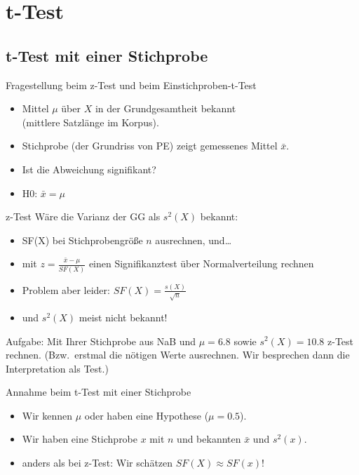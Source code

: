 \section[t-Test]{t-Test}

\subsection{t-Test mit einer Stichprobe}

\begin{frame}
  {Fragestellung beim z-Test und beim Einstichproben-t-Test}
  \begin{itemize}[<+->]
    \item Mittel $\mu$ über $X$ in der Grundgesamtheit bekannt\\
      (\zB mittlere Satzlänge im Korpus).
    \item Stichprobe (\zB der Grundriss von PE) zeigt gemessenes Mittel $\bar{x}$.
    \item Ist die Abweichung signifikant?
    \item \alert{H0: $\bar{x}=\mu$}
  \end{itemize}
\end{frame}

\begin{frame}
  {z-Test}
    Wäre die \alert{Varianz der GG} als $s^2(X)$ bekannt:\\
    \vspace{0.5cm}
    \begin{itemize}[<+->]
      \item SF(X) bei Stichprobengröße $n$ ausrechnen, und\ldots
      \item mit \alert{$z=\frac{\bar{x}-\mu}{SF(X)}$} einen Signifikanztest über Normalverteilung rechnen
        \vspace{\baselineskip}
      \item Problem aber leider: $SF(X)=\frac{s(X)}{\sqrt{n}}$
      \item und $s^2(X)$ meist nicht bekannt!
    \end{itemize}
    \vspace{\baselineskip}
    Aufgabe: Mit Ihrer Stichprobe aus NaB und $\mu=6.8$ sowie $s^2(X)=10.8$ z-Test rechnen. (Bzw.\ erstmal die nötigen Werte ausrechnen. Wir besprechen dann die Interpretation als Test.)
\end{frame}

\begin{frame}
  {Annahme beim t-Test mit einer Stichprobe}
  \begin{itemize}[<+->]
    \item Wir kennen $\mu$ oder haben eine Hypothese (\zB $\mu=0.5$).
    \item Wir haben eine Stichprobe $x$ mit $n$ und bekannten $\bar{x}$ und $s^2(x)$.
        \vspace{\baselineskip}
    \item anders als bei z-Test: \alert{Wir schätzen $SF(X)\approx SF(x)$!}
  \end{itemize}
\end{frame}

